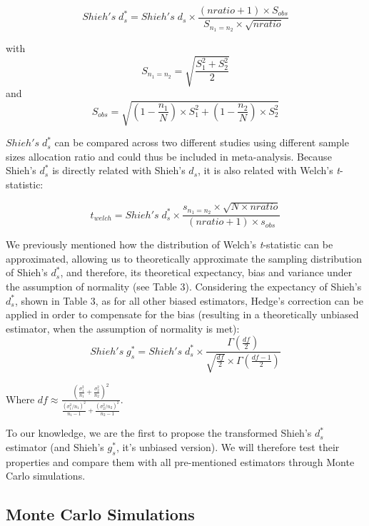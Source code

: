 \documentclass[
  man,floatsintext]{apa6}
\begin{document}
\begin{equation} 
Shieh's \; d^*_s= Shieh's \; d_s \times \frac{(nratio+1) \times S_{obs}}{S_{n_1=n_2} \times \sqrt{nratio}}
\label{eq:shiehvsbaldesign}
\end{equation}

with \[S_{n_1=n_2}= \sqrt{\frac{S_1^2+S_2^2}{2}}\] and
\[S_{obs} = \sqrt{(1- \frac{n_1}{N}) \times S_1^2+(1- \frac{n_2}{N}) \times S_2^2}\]

\(Shieh's \; d^*_s\) can be compared across two different studies using different sample sizes allocation ratio and could thus be included in meta-analysis. Because Shieh's \(d_s^*\) is directly related with Shieh's \(d_s\), it is also related with Welch's \emph{t}-statistic:

\begin{equation} 
t_{welch} = Shieh's \; d^*_s \times \frac{s_{n_1=n_2 }\times \sqrt{N \times nratio} }{(nratio+1) \times s_{obs}}
\label{eq:shiehvswelch}
\end{equation}

We previously mentioned how the distribution of Welch's \emph{t}-statistic can be approximated, allowing us to theoretically approximate the sampling distribution of Shieh's \(d^*_s\), and therefore, its theoretical expectancy, bias and variance under the assumption of normality (see Table 3). Considering the expectancy of Shieh's \(d^*_s\), shown in Table 3, as for all other biased estimators, Hedge's correction can be applied in order to compensate for the bias (resulting in a theoretically unbiased estimator, when the assumption of normality is met):
\begin{equation} 
Shieh's \; g^*_s = Shieh's \; d^*_s \times \frac{\Gamma(\frac{df}{2})}{\sqrt{\frac{df}{2}} \times \Gamma(\frac{df-1}{2})}
\label{eq:Hedgesgs}
\end{equation}

Where \(df \approx \frac{\left(\frac{\sigma^2_1}{n_1}+\frac{\sigma^2_2}{n_2} \right)^2}{\frac{(\sigma^2_1/n_1)^2}{n_1-1}+\frac{(\sigma^2_2/n_2)^2}{n_2-1}}\).

To our knowledge, we are the first to propose the transformed Shieh's \(d^*_s\) estimator (and Shieh's \(g^*_s\), it's unbiased version). We will therefore test their properties and compare them with all pre-mentioned estimators through Monte Carlo simulations.

\hypertarget{monte-carlo-simulations}{%
\subsection{Monte Carlo Simulations}\label{monte-carlo-simulations}}
\end{document}
